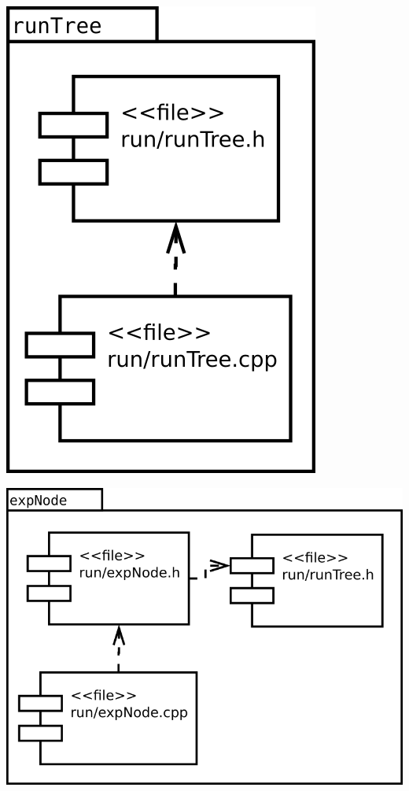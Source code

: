 \begin{multicols}{2}
\begin{center}
\includegraphics[scale=0.3]{files_arquitecture/runTree.png} \\
\end{center}
\begin{center}
\includegraphics[scale=0.3]{files_arquitecture/expNode.png} \\
\end{center}
\end{multicols}

